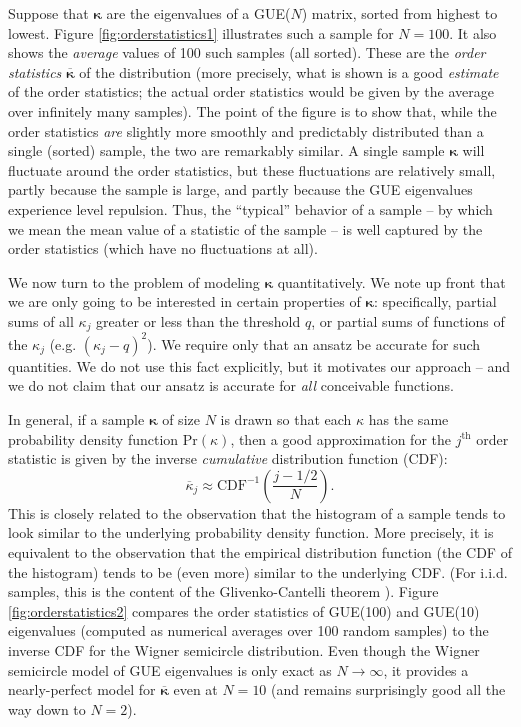 \documentclass[aps,pra, twocolumn]{revtex4-1}
\newcommand{\bvec}[1]{\boldsymbol{#1}}
\begin{document}
Suppose that $\bvec{\kappa}$ are the eigenvalues of a GUE($N$) matrix, sorted from highest to lowest.  Figure \ref{fig:orderstatistics1} illustrates such a sample for $N=100$.  It also shows the \emph{average} values of 100 such samples (all sorted).  These are the \emph{order statistics} $\overline{\bvec{\kappa}}$ of the distribution (more precisely, what is shown is a good \emph{estimate} of the order statistics; the actual order statistics would be given by the average over infinitely many samples).  The point of the figure is to show that, while the order statistics \emph{are} slightly more smoothly and predictably distributed than a single (sorted) sample, the two are remarkably similar.  A single sample $\bvec{\kappa}$ will fluctuate around the order statistics, but these fluctuations are relatively small, partly because the sample is large, and partly because the GUE eigenvalues experience level repulsion.  Thus, the ``typical'' behavior of a sample -- by which we mean the mean value of a statistic of the sample -- is well captured by the order statistics (which have no fluctuations at all).

We now turn to the problem of modeling $\bvec{\kappa}$ quantitatively.  We note up front that we are only going to be interested in certain properties of $\bvec{\kappa}$:  specifically, partial sums of all $\kappa_j$ greater or less than the threshold $q$, or partial sums of functions of the $\kappa_j$ (e.g. $(\kappa_j-q)^2$).  We require only that an ansatz be accurate for such quantities.  We do not use this fact explicitly, but it motivates our approach -- and we do not claim that our ansatz is accurate for \emph{all} conceivable functions.

In general, if a sample $\bvec{\kappa}$ of size $N$ is drawn so that each $\kappa$ has the same probability density 
function $\mathrm{Pr}(\kappa)$, then a good approximation for the $j^{\mathrm{th}}$ order statistic is given by the inverse 
\emph{cumulative} distribution function (CDF):
\begin{equation}
\overline{\kappa}_j \approx \mathrm{CDF}^{-1}\left(\frac{j-1/2}{N}\right).
\end{equation}
This is closely related to the observation that the histogram of a sample tends to look similar to the underlying probability density function.  More precisely, it is equivalent to the observation that the empirical distribution function (the CDF of the histogram) tends to be (even more) similar to the underlying CDF.  (For i.i.d. samples, this is the content of the Glivenko-Cantelli theorem \cite{VanderVaart2000}).  Figure \ref{fig:orderstatistics2} compares the order statistics of GUE(100) and GUE(10) eigenvalues (computed as numerical averages over 100 random samples) to the inverse CDF for the Wigner semicircle distribution.  Even though the Wigner semicircle model of GUE eigenvalues is only exact as $N\to\infty$, it provides a nearly-perfect model for $\overline{\bvec{\kappa}}$ even at $N=10$ (and remains surprisingly good all the way down to $N=2$).
\end{document}
